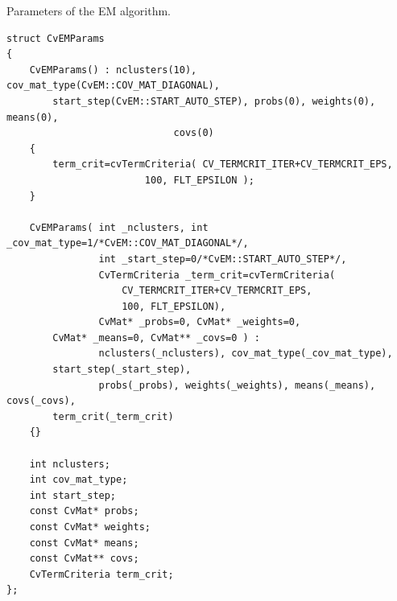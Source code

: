 
Parameters of the EM algorithm.

\begin{lstlisting}
struct CvEMParams
{
    CvEMParams() : nclusters(10), cov_mat_type(CvEM::COV_MAT_DIAGONAL),
        start_step(CvEM::START_AUTO_STEP), probs(0), weights(0), means(0), 
						     covs(0)
    {
        term_crit=cvTermCriteria( CV_TERMCRIT_ITER+CV_TERMCRIT_EPS, 
						100, FLT_EPSILON );
    }

    CvEMParams( int _nclusters, int _cov_mat_type=1/*CvEM::COV_MAT_DIAGONAL*/,
                int _start_step=0/*CvEM::START_AUTO_STEP*/,
                CvTermCriteria _term_crit=cvTermCriteria(
					CV_TERMCRIT_ITER+CV_TERMCRIT_EPS, 
					100, FLT_EPSILON),
                CvMat* _probs=0, CvMat* _weights=0, 
		CvMat* _means=0, CvMat** _covs=0 ) :
                nclusters(_nclusters), cov_mat_type(_cov_mat_type), 
		start_step(_start_step),
                probs(_probs), weights(_weights), means(_means), covs(_covs), 
		term_crit(_term_crit)
    {}

    int nclusters;
    int cov_mat_type;
    int start_step;
    const CvMat* probs;
    const CvMat* weights;
    const CvMat* means;
    const CvMat** covs;
    CvTermCriteria term_crit;
};
\end{lstlisting}

